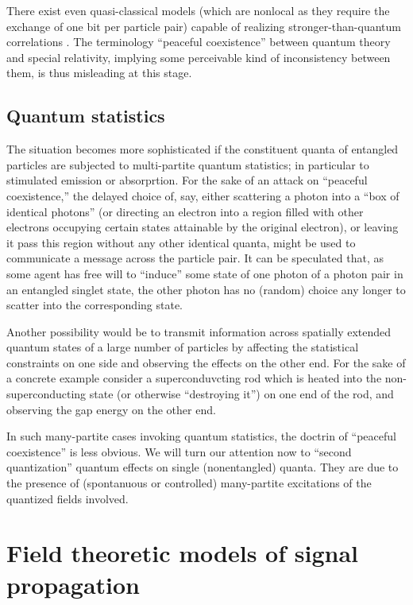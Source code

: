 \documentclass[%
  twocolumn,
 showpacs,
 showkeys,
 preprintnumbers,
 amsmath,amssymb,
 aps,
 prl,
  longbibliography,
 ]{revtex4-1}
\theoremstyle{definition}
\theoremstyle{remark}
\begin{document}
There exist even  quasi-classical models (which are nonlocal as they require the exchange of one bit per particle pair)
capable of realizing stronger-than-quantum correlations \cite{svozil-2004-brainteaser}.
The terminology ``peaceful coexistence'' \cite{shimony-78}
between quantum theory and special relativity, implying some perceivable kind of inconsistency between them,
is thus misleading at this stage.

\subsection{Quantum statistics}

The situation becomes more sophisticated if the constituent quanta of entangled particles are subjected to multi-partite quantum statistics;
in particular to stimulated emission or absorprtion.
For the sake of an attack \cite{svozil-slash} on ``peaceful coexistence,'' the delayed choice of, say, either scattering a photon into a ``box of identical photons''
(or directing an electron into a region filled with other electrons occupying certain states attainable by the original electron), or
leaving it pass this region without any other identical quanta,
might be used to communicate a message across the particle pair.
It can be speculated that, as some agent has free will to ``induce''
some state of one photon of a photon pair in an entangled singlet state,
the other photon has no (random) choice any longer to scatter into the corresponding state.

Another possibility would be to transmit information across spatially extended quantum states of a large number of particles by affecting
the statistical constraints on one side and observing the effects on the other end.
For the sake of a concrete example consider a superconduvcting rod which is heated into the non-superconducting state (or otherwise ``destroying it'') on one end of the rod,
and observing the gap energy on the other end.

In such many-partite cases invoking quantum statistics, the doctrin of ``peaceful coexistence'' is less obvious.
We will turn our attention now to ``second quantization'' quantum effects on single (nonentangled) quanta.
They are due to the presence of (spontanuous or controlled) many-partite excitations of the quantized fields involved.


\section{Field theoretic models of signal propagation}
\end{document}
